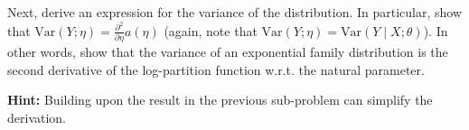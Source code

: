 \clearpage
\item {}
Next, derive an expression for the variance of the distribution. In particular,
show that $\text{Var}(Y; \eta) = \frac{\partial^2}{\partial\eta}a(\eta)$
(again, note that $\text{Var}(Y; \eta) = \text{Var}(Y\mid X; \theta)$). In
other words, show that the variance of an exponential family distribution is
the second derivative of the log-partition function w.r.t. the natural
parameter.

\textbf{Hint:} Building upon the result in the previous sub-problem can
simplify the derivation.

\ifnum{}\fi
